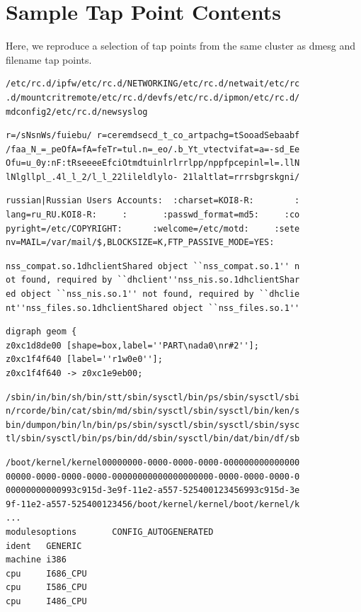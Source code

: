 \appendix
\section{Sample Tap Point Contents}


Here, we reproduce a selection of tap points from the same cluster as
dmesg and filename tap points.

\small

\begin{verbatim}
/etc/rc.d/ipfw/etc/rc.d/NETWORKING/etc/rc.d/netwait/etc/rc
.d/mountcritremote/etc/rc.d/devfs/etc/rc.d/ipmon/etc/rc.d/
mdconfig2/etc/rc.d/newsyslog
\end{verbatim}

\begin{verbatim}
r=/sNsnWs/fuiebu/ r=ceremdsecd_t_co_artpachg=tSooadSebaabf
/faa_N_=_peOfA=fA=feTr=tul.n=_eo/.b_Yt_vtectvifat=a=-sd_Ee
Ofu=u_0y:nF:tRseeeeEfciOtmdtuinlrlrrlpp/nppfpcepinl=l=.llN
lNlgllpl_.4l_l_2/l_l_22lileldlylo- 21laltlat=rrrsbgrskgni/
\end{verbatim}

\begin{verbatim}
russian|Russian Users Accounts:  :charset=KOI8-R:        :
lang=ru_RU.KOI8-R:     :       :passwd_format=md5:     :co
pyright=/etc/COPYRIGHT:      :welcome=/etc/motd:     :sete
nv=MAIL=/var/mail/$,BLOCKSIZE=K,FTP_PASSIVE_MODE=YES:     
\end{verbatim}

\begin{verbatim}
nss_compat.so.1dhclientShared object ``nss_compat.so.1'' n
ot found, required by ``dhclient''nss_nis.so.1dhclientShar
ed object ``nss_nis.so.1'' not found, required by ``dhclie
nt''nss_files.so.1dhclientShared object ``nss_files.so.1''
\end{verbatim}

\begin{verbatim}
digraph geom {
z0xc1d8de00 [shape=box,label=''PART\nada0\nr#2''];
z0xc1f4f640 [label=''r1w0e0''];
z0xc1f4f640 -> z0xc1e9eb00;
\end{verbatim}

\begin{verbatim}
/sbin/in/bin/sh/bin/stt/sbin/sysctl/bin/ps/sbin/sysctl/sbi
n/rcorde/bin/cat/sbin/md/sbin/sysctl/sbin/sysctl/bin/ken/s
bin/dumpon/bin/ln/bin/ps/sbin/sysctl/sbin/sysctl/sbin/sysc
tl/sbin/sysctl/bin/ps/bin/dd/sbin/sysctl/bin/dat/bin/df/sb
\end{verbatim}

\begin{verbatim}
/boot/kernel/kernel00000000-0000-0000-0000-000000000000000
00000-0000-0000-0000-00000000000000000000-0000-0000-0000-0
00000000000993c915d-3e9f-11e2-a557-525400123456993c915d-3e
9f-11e2-a557-525400123456/boot/kernel/kernel/boot/kernel/k
...
modulesoptions       CONFIG_AUTOGENERATED
ident   GENERIC
machine i386
cpu     I686_CPU
cpu     I586_CPU
cpu     I486_CPU
\end{verbatim}

